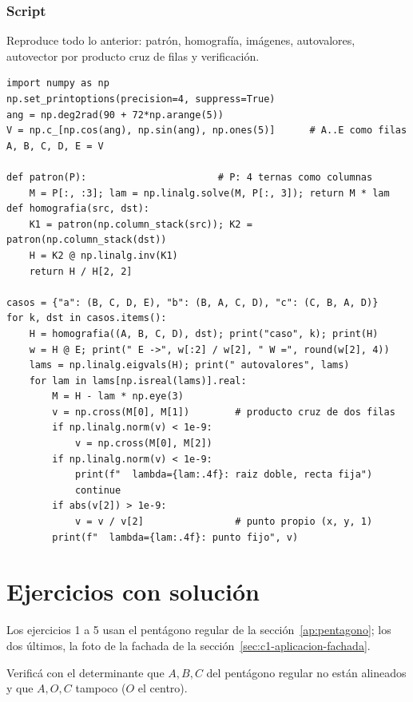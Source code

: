 \subsubsection{Script}
Reproduce todo lo anterior: patrón, homografía, imágenes, autovalores, autovector por
producto cruz de filas y verificación.
\begin{verbatim}
import numpy as np
np.set_printoptions(precision=4, suppress=True)
ang = np.deg2rad(90 + 72*np.arange(5))
V = np.c_[np.cos(ang), np.sin(ang), np.ones(5)]      # A..E como filas
A, B, C, D, E = V

def patron(P):                       # P: 4 ternas como columnas
    M = P[:, :3]; lam = np.linalg.solve(M, P[:, 3]); return M * lam
def homografia(src, dst):
    K1 = patron(np.column_stack(src)); K2 = patron(np.column_stack(dst))
    H = K2 @ np.linalg.inv(K1)
    return H / H[2, 2]

casos = {"a": (B, C, D, E), "b": (B, A, C, D), "c": (C, B, A, D)}
for k, dst in casos.items():
    H = homografia((A, B, C, D), dst); print("caso", k); print(H)
    w = H @ E; print(" E ->", w[:2] / w[2], " W =", round(w[2], 4))
    lams = np.linalg.eigvals(H); print(" autovalores", lams)
    for lam in lams[np.isreal(lams)].real:
        M = H - lam * np.eye(3)
        v = np.cross(M[0], M[1])        # producto cruz de dos filas
        if np.linalg.norm(v) < 1e-9:
            v = np.cross(M[0], M[2])
        if np.linalg.norm(v) < 1e-9:
            print(f"  lambda={lam:.4f}: raiz doble, recta fija")
            continue
        if abs(v[2]) > 1e-9:
            v = v / v[2]                # punto propio (x, y, 1)
        print(f"  lambda={lam:.4f}: punto fijo", v)
\end{verbatim}

\section{Ejercicios con solución}

Los ejercicios 1 a 5 usan el pentágono regular de la sección~\ref{ap:pentagono}; los dos
últimos, la foto de la fachada de la sección~\ref{sec:c1-aplicacion-fachada}.

\begin{ejercicio}
Verificá con el determinante que \(A,B,C\) del pentágono regular no están alineados y que
\(A,O,C\) tampoco (\(O\) el centro).
\end{ejercicio}

